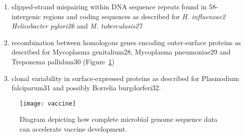 \begin{enumerate}
	\item slipped-strand mispairing
	within DNA sequence repeats found in 58-intergenic regions and coding sequences as described for \textit{H. influenzae2} \textit{ Helicobacter pylori26}  and \textit{M. tuberculosis27} 
	
	\item recombination between homologous genes
	encoding outer-surface proteins as described for Mycoplasma
	genitalium28, Mycoplasma pneumoniae29 and Treponema pallidum30 (Figure~\ref{fig:vac})
	
	\item clonal variability in surface-expressed proteins as described for Plasmodium falciparum31 and possibly Borrelia burgdorferi32. \cite{fraser2000microbial}
	
\end{enumerate} 

\begin{figure}
	\centering
	\texttt{[image: vaccine]}
	\caption{ Diagram depicting how complete microbial genome sequence data can accelerate vaccine development.}
	\label{fig:vac}
\end{figure} 

